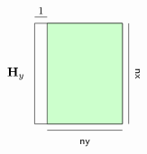 \documentclass[10pt]{article}
\begin{document}
\[\begin{tikzpicture}
%
\node[draw=black,minimum width=7em,minimum height=8em,rectangle]  at (0,0) {};
\node[draw=black,fill=green!20,minimum width=6em,minimum height=8em,rectangle]  at (0.5em,0) {};
%
\node[]  at (-5em,0) {${\bf H}_y$};
%
\draw[] (-3.5em,4.5em) -- (-2.5em,4.5em);
\draw[] (-2.5em,-4.5em) -- (3.5em,-4.5em);
\draw[] (4em,-4em) -- (4em,4em);
%
\node[]  at (0.5em,-5.5em) {\footnotesize{{\sf ny}}};
\node[rotate=-90]  at (4.7em,0) {\footnotesize{{\sf nx}}};
\node[]  at (-3em,5em) {\footnotesize{1}};
\end{tikzpicture}
\]
\end{document}
